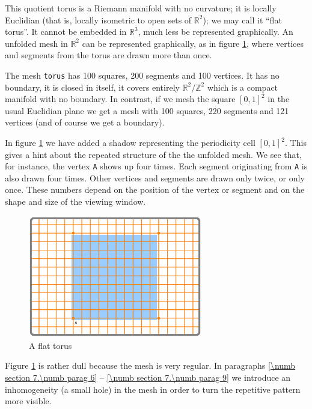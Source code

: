 This quotient torus is a Riemann manifold with no curvature; it is locally Euclidian
(that is, locally isometric to open sets of $ \mathbb{R}^2 $); we may call it ``flat torus''.
It cannot be embedded in $ \mathbb{R}^3 $, much less be represented graphically.
An unfolded mesh in $ \mathbb{R}^2 $ can be represented graphically,
as in figure \ref{\numb section 7.\numb fig 1}, where vertices and segments from the torus
are drawn more than once.

The mesh {\small\tt torus} has 100 squares, 200 segments and 100 vertices.
It has no boundary, it is closed in itself, it covers entirely $ \mathbb{R}^2/{\mathbb Z}^2 $
which is a compact manifold with no boundary.
In contrast, if we mesh the square $ [0,1]^2 $ in the usual Euclidian plane
we get a mesh with 100 squares, 220 segments and 121 vertices (and of course we get a boundary).

In figure \ref{\numb section 7.\numb fig 1} we have added a shadow representing
the periodicity cell $ [0,1]^2 $.
This gives a hint about the repeated structure of the the unfolded mesh.
We see that, for instance, the vertex {\small\tt A} shows up four times.
Each segment originating from {\small\tt A} is also drawn four times.
Other vertices and segments are drawn only twice, or only once.
These numbers depend on the position of the vertex or segment and on the shape and size
of the viewing window.

\begin{figure}[ht] \centering
  \includegraphics[width=76mm]{flat-torus-1.eps}
  \caption{A flat torus}
  \label{\numb section 7.\numb fig 1}
\end{figure}

Figure \ref{\numb section 7.\numb fig 1} is rather dull because the mesh is very regular.
In paragraphs \ref{\numb section 7.\numb parag 6} -- \ref{\numb section 7.\numb parag 9}
we introduce an inhomogeneity (a small hole) in the mesh in order to turn the repetitive pattern
more visible.

